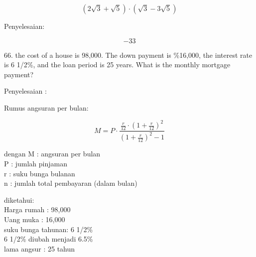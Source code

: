 \documentclass[a4paper,10pt]{article}
\begin{document}
\begin{eulernotebook}
\begin{eulercomment}
\begin{eulercomment}
\begin{eulercomment}
\begin{eulercomment}
\begin{eulercomment}
\begin{eulercomment}
\begin{eulercomment}
\begin{eulercomment}
\begin{eulercomment}
\end{eulercomment}
\begin{eulerformula}
\[
(2\sqrt{3} + \sqrt{5})\cdot (\sqrt{3}-3\sqrt{5})
\]
\end{eulerformula}
\begin{eulercomment}
Penyelesaian:
\end{eulercomment}
\begin{eulerformula}
\[
-33
\]
\end{eulerformula}
\begin{eulercomment}
\end{eulercomment}
\begin{eulercomment}
66. the cost of a house is \textdollar{}98,000. The down payment is \%16,000, the
interest rate is 6 1/2\%, and the loan period is 25 years. What is the
monthly mortgage payment?

Penyelesaian :

Rumus angsuran per bulan:\\
\end{eulercomment}
\begin{eulerformula}
\[
M = P \cdot \frac{\frac{r}{12} \cdot (1 +\frac{r}{12})^2}{(1 +\frac{r}{12})^2 - 1}
\]
\end{eulerformula}
\begin{eulercomment}
dengan M : angsuran per bulan\\
P : jumlah pinjaman\\
r : suku bunga bulanan\\
n : jumlah total pembayaran (dalam bulan)

diketahui:\\
Harga rumah : \textdollar{}98,000\\
Uang muka : \textdollar{}16,000\\
suku bunga tahunan: 6 1/2\%\\
6 1/2\% diubah menjadi 6.5\%\\
lama angsur : 25 tahun


\end{eulercomment}
\end{eulercomment}
\end{eulercomment}
\end{eulercomment}
\end{eulercomment}
\end{eulercomment}
\end{eulercomment}
\end{eulercomment}
\end{eulercomment}
\end{eulernotebook}
\end{document}
